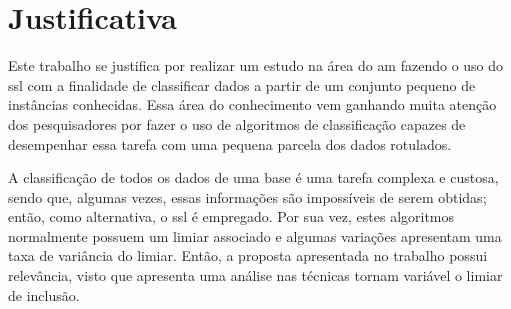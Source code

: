 \section{Justificativa}
    \label{sec:justificativa}
    Este trabalho se justifica por realizar um estudo na área do \ac{am} fazendo o uso do \ac{ssl} com a finalidade de classificar dados a partir de um conjunto pequeno de instâncias conhecidas. Essa área do conhecimento vem ganhando muita atenção dos pesquisadores por fazer o uso de algoritmos de classificação capazes de desempenhar essa tarefa com uma pequena parcela dos dados rotulados.
    
    
    A classificação de todos os dados de uma base é uma tarefa complexa e custosa, sendo que, algumas vezes, essas informações são impossíveis de serem obtidas; então, como alternativa, o \ac{ssl} é empregado. Por sua vez, estes algoritmos normalmente possuem um limiar associado e algumas variações apresentam uma taxa de variância do limiar. Então, a proposta apresentada no trabalho possui relevância, visto que apresenta uma análise nas técnicas tornam variável o limiar de inclusão.